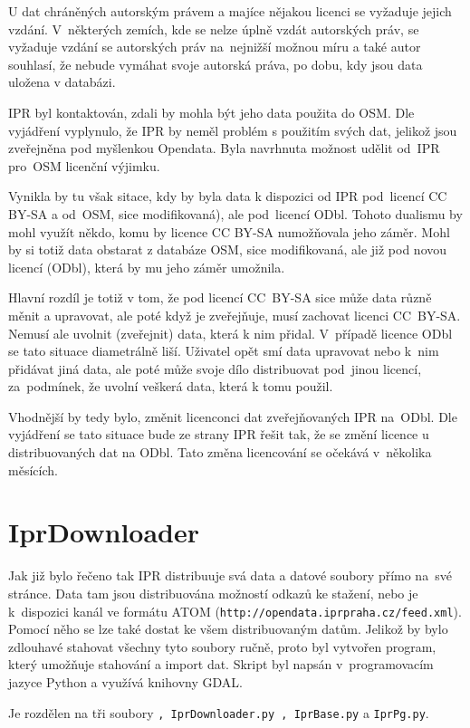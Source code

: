 U dat chráněných autorským právem a majíce nějakou licenci se vyžaduje
jejich vzdání. V~některých zemích, kde se nelze úplně vzdát
autorských práv, se vyžaduje vzdání se autorských práv na~nejnižší
možnou míru a také autor souhlasí, že nebude vymáhat svoje autorská
práva, po dobu, kdy jsou data uložena v databázi. \cite{ODbl}

IPR byl kontaktován, zdali by mohla být jeho data použita do OSM.
Dle vyjádření vyplynulo, že IPR by neměl problém s použitím svých dat,
jelikož jsou zveřejněna pod myšlenkou Opendata. Byla navrhnuta
možnost udělit od~IPR pro~OSM licenční výjimku.

Vynikla by tu však sitace, kdy by byla data k dispozici od IPR
pod~licencí CC BY-SA a od~OSM, sice modifikovaná), ale pod~licencí
ODbl. Tohoto dualismu by mohl využít někdo, komu by licence CC BY-SA
numožňovala jeho záměr. Mohl by si totiž data obstarat z databáze OSM,
sice modifikovaná, ale již pod novou licencí (ODbl), která by mu jeho
záměr umožnila.

Hlavní rozdíl je totiž v tom, že pod licencí CC~BY-SA sice může data
různě měnit a upravovat, ale poté když je zveřejňuje, musí zachovat
licenci CC~BY-SA. Nemusí ale uvolnit (zveřejnit) data, která k nim 
přidal. V~případě licence ODbl se tato situace diametrálně liší.
Uživatel opět smí data upravovat nebo k~nim přidávat jiná data, ale
poté může svoje dílo distribuovat pod~jinou licencí, za~podmínek, že
uvolní veškerá data, která k tomu použil.

Vhodnější by tedy bylo, změnit licenconci dat zveřejňovaných IPR
na~ODbl. Dle vyjádření se tato situace bude ze strany IPR řešit tak,
že se změní licence u distribuovaných dat na ODbl. Tato změna
licencování se očekává v~několika měsících.


\section{IprDownloader}
\label{IprDownloader}
Jak již bylo řečeno tak IPR distribuuje svá data a datové soubory přímo
na~své stránce. Data tam jsou distribuována možností odkazů ke stažení,
nebo je k~dispozici kanál ve formátu ATOM ({\tt http://opendata.iprpraha.cz/feed.xml}).
Pomocí něho se lze také dostat ke všem distribuovaným datům. Jelikož
by bylo zdlouhavé stahovat všechny tyto soubory ručně, proto byl
vytvořen program, který umožňuje stahování a import dat. Skript byl
napsán v~programovacím jazyce Python a využívá knihovny GDAL.

Je rozdělen na tři soubory 
{\tt , IprDownloader.py , IprBase.py} a {\tt IprPg.py}.


